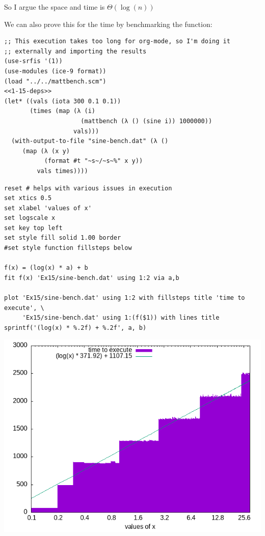 \documentclass[final,fleqn,titlepage]{article}
\begin{document}
So I argue the space and time is \(\Theta(\log(n))\)


We can also prove this for the time by benchmarking the function:

\begin{verbatim}
;; This execution takes too long for org-mode, so I'm doing it
;; externally and importing the results
(use-srfis '(1))
(use-modules (ice-9 format))
(load "../../mattbench.scm")
<<1-15-deps>>
(let* ((vals (iota 300 0.1 0.1))
       (times (map (λ (i)
                     (mattbench (λ () (sine i)) 1000000))
                   vals)))
  (with-output-to-file "sine-bench.dat" (λ ()
     (map (λ (x y)
           (format #t "~s~/~s~%" x y))
         vals times))))
\end{verbatim}

\begin{verbatim}
reset # helps with various issues in execution
set xtics 0.5
set xlabel 'values of x'
set logscale x
set key top left
set style fill solid 1.00 border
#set style function fillsteps below

f(x) = (log(x) * a) + b
fit f(x) 'Ex15/sine-bench.dat' using 1:2 via a,b

plot 'Ex15/sine-bench.dat' using 1:2 with fillsteps title 'time to execute', \
     'Ex15/sine-bench.dat' using 1:(f($1)) with lines title sprintf('(log(x) * %.2f) + %.2f', a, b)
\end{verbatim}

\begin{center}
\includegraphics[width=.9\linewidth]{fig/1-15-bench.png}
\end{center}
\end{document}

